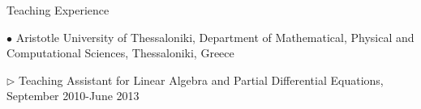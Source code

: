 \documentclass[10pt]{article} %
\newenvironment{outerlist}[1][\enskip\textbullet]%
        {\begin{itemize}[#1]}{\end{itemize}%
         \vspace{-.6\baselineskip}}
\newenvironment{innerlist}[1][\enskip\textbullet]%
        {\begin{compactitem}[#1]}{\end{compactitem}}
\begin{document}
\begin{section}{Teaching Experience}
\begin{outerlist}
\begin{innerlist}
% 
\end{innerlist}
\item[$\bullet$] Aristotle University of Thessaloniki, Department of Mathematical, Physical and Computational 
Sciences, Thessaloniki, Greece
\begin{innerlist}
\item[$\triangleright$] Teaching Assistant for Linear Algebra and Partial Differential Equations, 
September 2010-June 2013
\end{innerlist}

\end{outerlist}

\end{section}
\end{document}
